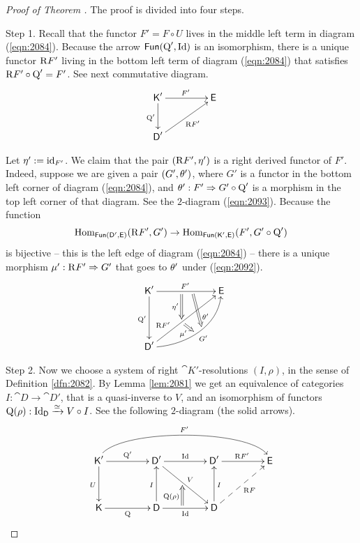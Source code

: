 \begin{proof}[Proof of Theorem \tup{\ref{thm:2080}}] 
The proof is divided into four steps.  

\smallskip \noindent 
Step 1. Recall that the functor $F' = F \circ U$ lives in the middle left term 
in diagram (\ref{eqn:2084}). Because the arrow $\operatorname{\mathsf{Fun}}(\operatorname{Q}', \operatorname{Id})$
is an isomorphism, there is a unique functor 
$\mathrm{R} F'$ living in the bottom left term of diagram (\ref{eqn:2084}) that 
satisfies $\mathrm{R} F' \circ \operatorname{Q}' = F'$. See next commutative diagram. 
\begin{equation} \label{eqn:2091}
\UseTips \xymatrix @C=10ex @R=6ex {
\cat{K}'
\ar[r]^{F'}
\ar[d]_{\opn{Q}'}
&
\cat{E}
\\
\cat{D}'
\ar[ur]_{\mrm{R} F'}
} 
\end{equation}

Let $\eta' := \operatorname{id}_{F'}$.
We claim that the pair $(\mathrm{R} F', \eta')$ is a right derived functor of 
$F'$. Indeed, suppose we are given a pair $(G', \theta')$, 
where $G'$ is a functor in the bottom left corner of diagram (\ref{eqn:2084}), 
and $\theta' : F' \Rightarrow G'  \circ \operatorname{Q}'$ 
is a morphism in the top left corner of that diagram. See the $2$-diagram
(\ref{eqn:2093}). 
Because the function 
\begin{equation} \label{eqn:2092} 
\operatorname{Hom}_{\operatorname{\mathsf{Fun}}(\operatorname{\mathsf{D}}', \operatorname{\mathsf{E}})}
(\mathrm{R} F', G') \to 
\operatorname{Hom}_{\operatorname{\mathsf{Fun}}(\operatorname{\mathsf{K}}', \operatorname{\mathsf{E}})}
(F', G' \circ \operatorname{Q}') 
\end{equation}
is bijective -- this is the left edge of diagram (\ref{eqn:2084}) -- 
there is a unique morphism 
$\mu' : \mathrm{R} F' \Rightarrow G'$ that goes to $\theta'$ under (\ref{eqn:2092}). 
\begin{equation} \label{eqn:2093} 
\UseTips  \xymatrix @C=14ex @R=10ex {
\cat{K}'
\ar[r]^{F'} _(0.45){}="q"  ^(0.6){}="q2" 
\ar[d]_{\opn{Q}'}
& 
\cat{E} 
\\
\cat{D}'
\ar[ur]^(0.3){\mrm{R} F'} ^(0.45){}="f" ^(0.5){}="f1" 
\ar@{=>}  "q";"f" _{\eta'}
\ar@(r,d)[ru]_{G'} ^(0.55){}="g"  ^(0.48){}="g1"
\ar@{=>}  "q2";"g" ^(0.7){\th'}
\ar@{=>}  "f";"g1" _(0.45){\mu'}
} 
\end{equation}


\medskip \noindent 
Step 2. Now we choose a system of right $\cat{K}'$-resolutions 
$(I, \rho)$, in the sense of Definition \ref{dfn:2082}.
By Lemma \ref{lem:2081}  we get an equivalence of categories
$I : \cat{D} \to \cat{D}'$, that is a quasi-inverse to $V$, and 
an isomorphism of functors 
$\operatorname{Q}(\rho) : \operatorname{Id}_{\operatorname{\mathsf{D}}} \xrightarrow{\simeq} V \circ I$. 
See the following $2$-diagram (the solid arrows). 
\begin{equation} \label{eqn:2094} 
\UseTips  \xymatrix @C=10ex @R=8ex {
\cat{K}'
\ar[r]^{\opn{Q}'}
\ar[d]_{U}
\ar@(u,u)[rrr]^{F'}
&
\cat{D}'
\ar[dr]^{V} _(0.45){}="t" 
\ar[r]^{\opn{Id}}
&
\cat{D}'
\ar[r]^{\mrm{R} F'}
&
\cat{E}
\\
\cat{K}
\ar[r]_{\opn{Q}} _{}="q"
&
\cat{D} 
\ar[u]^{I}
\ar[r]_{\opn{Id}} ^(0.45){}="s"
\ar@{=>}  "s";"t" ^(0.45){\opn{Q}(\rho)}
&
\cat{D} 
\ar[u]_{I}
\ar@{-->}[ur]_{\mrm{R} F}
} 
\end{equation}


\end{proof}
